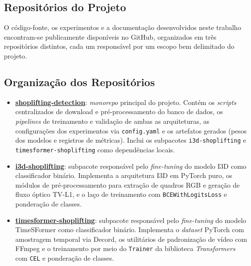 \documentclass[12pt, %
openright, 
oneside, %
a4paper,    %
brazil]{facom-ufu-abntex2}
\begin{document}
\begin{apendicesenv}

\partapendices

\chapter{Repositórios do Projeto}
\label{apendice:github}

O código-fonte, os experimentos e a documentação desenvolvidos neste trabalho encontram-se publicamente disponíveis no GitHub, organizados em três repositórios distintos, cada um responsável por um escopo bem delimitado do projeto.

\section*{Organização dos Repositórios}

\begin{itemize}
    \item \textbf{\href{https://github.com/luis-cmenezes/shoplifting-detection}{shoplifting-detection}}: \textit{monorepo} principal do projeto. Contém os \textit{scripts} centralizados de download e pré-processamento do banco de dados, os \textit{pipelines} de treinamento e validação de ambas as arquiteturas, as configurações dos experimentos via \texttt{config.yaml} e os artefatos gerados (pesos dos modelos e registros de métricas). Inclui os subpacotes \texttt{i3d-shoplifting} e \texttt{timesformer-shoplifting} como dependências locais.

    \item \textbf{\href{https://github.com/luis-cmenezes/i3d-shoplifting}{i3d-shoplifting}}: subpacote responsável pelo \textit{fine-tuning} do modelo I3D como classificador binário. Implementa a arquitetura I3D em PyTorch puro, os módulos de pré-processamento para extração de quadros RGB e geração de fluxo óptico TV-L1, e o laço de treinamento com \texttt{BCEWithLogitsLoss} e ponderação de classes.

    \item \textbf{\href{https://github.com/luis-cmenezes/timesformer-shoplifting}{timesformer-shoplifting}}: subpacote responsável pelo \textit{fine-tuning} do modelo TimeSFormer como classificador binário. Implementa o \textit{dataset} PyTorch com amostragem temporal via Decord, os utilitários de padronização de vídeo com FFmpeg e o treinamento por meio do \texttt{Trainer} da biblioteca \textit{Transformers} com \texttt{CEL} e ponderação de classes.
\end{itemize}


\end{apendicesenv}
\end{document}
